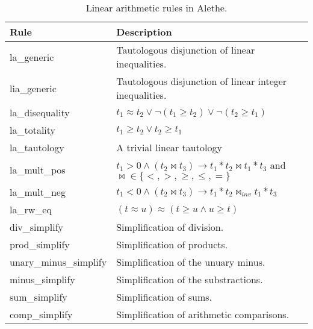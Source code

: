 \begin{table}[]
    \centering
    \begin{tabular}{ll}
    Rule & Description \\ \hline
    la\_generic & Tautologous disjunction of linear inequalities. \\
    lia\_generic & Tautologous disjunction of linear integer inequalities. \\
    la\_disequality & $t_1 \approx t_2 \lor \neg (t_1 \geq t_2) \lor \neg (t_2 \geq t_1)$ \\
    la\_totality & $t_1 \geq t_2 \lor t_2 \geq t_1$ \\
    la\_tautology & A trivial linear tautology \\
    la\_mult\_pos & $t_1 > 0 \land (t_2 \bowtie t_3) \rightarrow t_1 * t_2 \bowtie t_1 * t_3$ and $\bowtie \in \{<, >, \geq, \leq, =\}$ \\
    la\_mult\_neg & $t_1 < 0 \land (t_2 \bowtie t_3) \rightarrow t_1 * t_2 \bowtie_{inv} t_1 * t_3$ \\
    la\_rw\_eq & $(t \approx u) \approx (t \geq u \land u \geq t)$ \\
    div\_simplify & Simplification of division. \\
    prod\_simplify & Simplification of products. \\
    unary\_minus\_simplify & Simplification of the unuary minus. \\
    minus\_simplify & Simplification of the substractions. \\
    sum\_simplify & Simplification of sums. \\
    comp\_simplify & Simplification of arithmetic comparisons. \\
    \end{tabular}
    \caption{Linear arithmetic rules in Alethe.}
    \label{table:linear-arith-rules}
\end{table}

